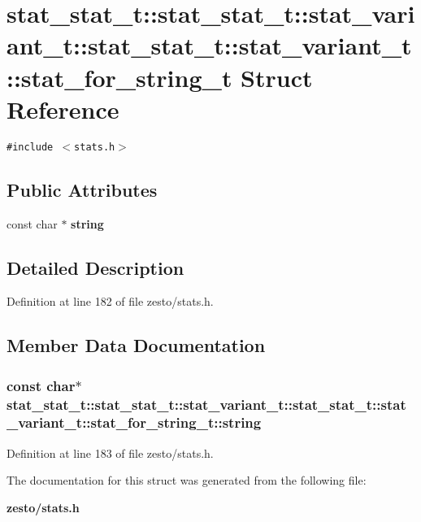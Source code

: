 \section{stat\_\-stat\_\-t::stat\_\-stat\_\-t::stat\_\-variant\_\-t::stat\_\-stat\_\-t::stat\_\-variant\_\-t::stat\_\-for\_\-string\_\-t Struct Reference}
\label{structstat__stat__t_1_1stat__variant__t_1_1stat__for__string__t}
{\tt \#include $<$stats.h$>$}

\subsection*{Public Attributes}
\begin{CompactItemize}
\item 
const char $\ast$ {\bf string}
\end{CompactItemize}


\subsection{Detailed Description}


Definition at line 182 of file zesto/stats.h.

\subsection{Member Data Documentation}
\subsubsection[{string}]{\setlength{\rightskip}{0pt plus 5cm}const char$\ast$ stat\_\-stat\_\-t::stat\_\-stat\_\-t::stat\_\-variant\_\-t::stat\_\-stat\_\-t::stat\_\-variant\_\-t::stat\_\-for\_\-string\_\-t::string}\label{structstat__stat__t_1_1stat__variant__t_1_1stat__for__string__t_9c6caa2762e366011926bfa8822121eb}




Definition at line 183 of file zesto/stats.h.

The documentation for this struct was generated from the following file:\begin{CompactItemize}
\item 
{\bf zesto/stats.h}\end{CompactItemize}
